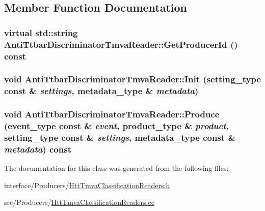 \subsection{Member Function Documentation}
\hypertarget{classAntiTtbarDiscriminatorTmvaReader_adfd8a81ccfe692021fa40adeb0d9eed9}{
\subsubsection[{GetProducerId}]{\setlength{\rightskip}{0pt plus 5cm}virtual std::string AntiTtbarDiscriminatorTmvaReader::GetProducerId () const}}
\label{classAntiTtbarDiscriminatorTmvaReader_adfd8a81ccfe692021fa40adeb0d9eed9}
\hypertarget{classAntiTtbarDiscriminatorTmvaReader_ac535a532e2737e6991fd6d36d49cb12f}{
\subsubsection[{Init}]{\setlength{\rightskip}{0pt plus 5cm}void AntiTtbarDiscriminatorTmvaReader::Init (setting\_\-type const \& {\em settings}, \/  metadata\_\-type \& {\em metadata})}}
\label{classAntiTtbarDiscriminatorTmvaReader_ac535a532e2737e6991fd6d36d49cb12f}
\hypertarget{classAntiTtbarDiscriminatorTmvaReader_aceac156af9c7dd33d0c4f3827ad7a27d}{
\subsubsection[{Produce}]{\setlength{\rightskip}{0pt plus 5cm}void AntiTtbarDiscriminatorTmvaReader::Produce (event\_\-type const \& {\em event}, \/  product\_\-type \& {\em product}, \/  setting\_\-type const \& {\em settings}, \/  metadata\_\-type const \& {\em metadata}) const}}
\label{classAntiTtbarDiscriminatorTmvaReader_aceac156af9c7dd33d0c4f3827ad7a27d}


The documentation for this class was generated from the following files:\begin{DoxyCompactItemize}
\item 
interface/Producers/\hyperlink{HttTmvaClassificationReaders_8h}{HttTmvaClassificationReaders.h}\item 
src/Producers/\hyperlink{HttTmvaClassificationReaders_8cc}{HttTmvaClassificationReaders.cc}\end{DoxyCompactItemize}
